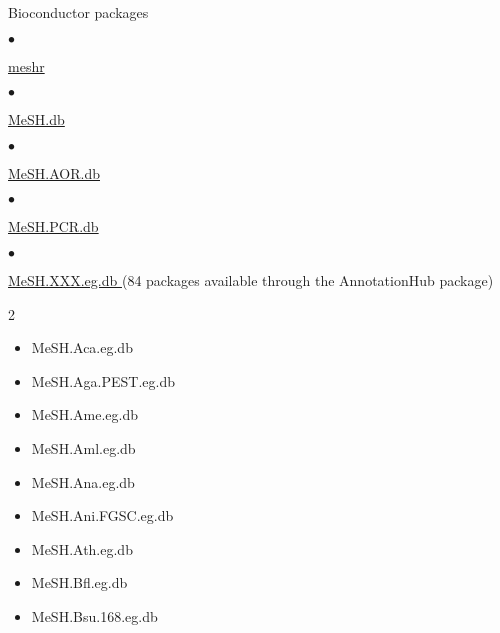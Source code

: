 \documentclass[margin,line,10pt]{res}
\newenvironment{list1}{
  \begin{list}{\ding{113}}{%
      \setlength{\itemsep}{0in}
      \setlength{\parsep}{0in} \setlength{\parskip}{0in}
      \setlength{\topsep}{0in} \setlength{\partopsep}{0in} 
      \setlength{\leftmargin}{0.17in}}}{\end{list}}
\newenvironment{list2}{
  \begin{list}{$\bullet$}{%
      \setlength{\itemsep}{0in}
      \setlength{\parsep}{0in} \setlength{\parskip}{0in}
      \setlength{\topsep}{0in} \setlength{\partopsep}{0in} 
      \setlength{\leftmargin}{0.2in}}}{\end{list}}
\begin{document}
\begin{resume}
\begin{list1}
\vspace{0.3cm}
\item[] Bioconductor packages
\begin{list2}
\item \textcolor{blue}{\href{http://bioconductor.org/packages/release/bioc/html/meshr.html}{meshr}}
\end{list2}
\vspace{0.3cm}
\begin{list2}
\item  \textcolor{blue}{\href{http://bioconductor.org/packages/release/data/annotation/html/MeSH.db.html}{MeSH.db}}
\end{list2}
\vspace{0.3cm}
\begin{list2}
\item \textcolor{blue}{\href{http://www.bioconductor.org/packages/release/data/annotation/html/MeSH.AOR.db.html}{MeSH.AOR.db}}
\end{list2}
\vspace{0.3cm}
\begin{list2}
\item \textcolor{blue}{\href{http://www.bioconductor.org/packages/release/data/annotation/html/MeSH.PCR.db.html}{MeSH.PCR.db}}
\end{list2}
\vspace{0.3cm}
\begin{list2}
\item \textcolor{blue}{\href{http://www.bioconductor.org/packages/release/data/annotation/}{MeSH.XXX.eg.db }} (84 packages available through the AnnotationHub package)
\end{list2}
\begin{multicols}{2}
\begin{itemize}
\item MeSH.Aca.eg.db
\item MeSH.Aga.PEST.eg.db
\item MeSH.Ame.eg.db
\item MeSH.Aml.eg.db
\item MeSH.Ana.eg.db
\item MeSH.Ani.FGSC.eg.db
\item MeSH.Ath.eg.db
\item MeSH.Bfl.eg.db
\item MeSH.Bsu.168.eg.db

\end{itemize}
\end{multicols}
\end{list1}
\end{resume}
\end{document}
